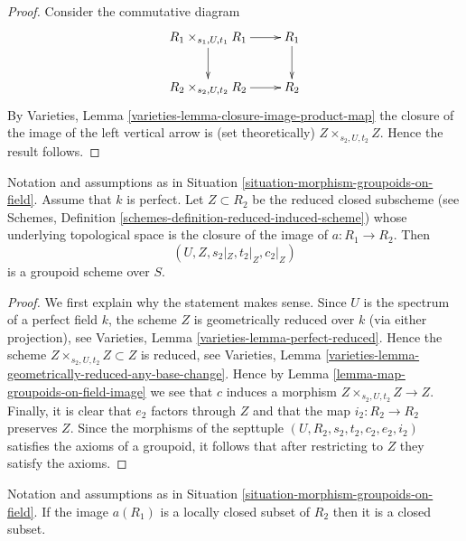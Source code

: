 \begin{proof}
Consider the commutative diagram
$$
\xymatrix{
R_1 \times_{s_1, U, t_1} R_1 \ar[r] \ar[d] & R_1 \ar[d] \\
R_2 \times_{s_2, U, t_2} R_2 \ar[r] & R_2
}
$$
By
Varieties, Lemma \ref{varieties-lemma-closure-image-product-map}
the closure of the image of the left vertical arrow is (set theoretically)
$Z \times_{s_2, U, t_2} Z$.
Hence the result follows.
\end{proof}

\begin{lemma}
\label{lemma-map-groupoids-on-perfect-field-image}
Notation and assumptions as in
Situation \ref{situation-morphism-groupoids-on-field}.
Assume that $k$ is perfect.
Let $Z \subset R_2$ be the reduced closed subscheme (see
Schemes, Definition \ref{schemes-definition-reduced-induced-scheme})
whose underlying topological space is the closure of the image of
$a : R_1 \to R_2$. Then
$$
(U, Z, s_2|_Z, t_2|_Z, c_2|_Z)
$$
is a groupoid scheme over $S$.
\end{lemma}

\begin{proof}
We first explain why the statement makes sense. Since $U$ is the spectrum
of a perfect field $k$, the scheme $Z$ is geometrically reduced
over $k$ (via either projection), see
Varieties, Lemma \ref{varieties-lemma-perfect-reduced}.
Hence the scheme $Z \times_{s_2, U, t_2} Z \subset Z$
is reduced, see
Varieties, Lemma \ref{varieties-lemma-geometrically-reduced-any-base-change}.
Hence by
Lemma \ref{lemma-map-groupoids-on-field-image}
we see that $c$ induces a morphism
$Z \times_{s_2, U, t_2} Z \to Z$.
Finally, it is clear that $e_2$ factors through $Z$
and that the map $i_2 : R_2 \to R_2$ preserves $Z$. Since the morphisms
of the septtuple
$(U, R_2, s_2, t_2, c_2, e_2, i_2)$
satisfies the axioms of a groupoid, it follows that after restricting
to $Z$ they satisfy the axioms.
\end{proof}

\begin{lemma}
\label{lemma-locally-closed-image-is-closed}
Notation and assumptions as in
Situation \ref{situation-morphism-groupoids-on-field}.
If the image $a(R_1)$ is a locally closed subset of $R_2$
then it is a closed subset.
\end{lemma}

